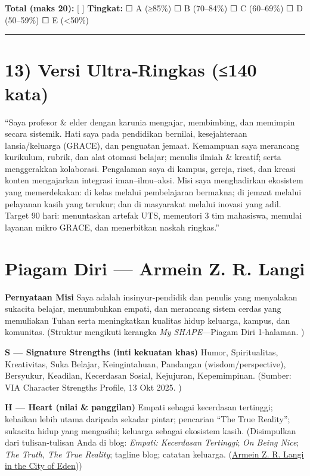 \documentclass[
  letterpaper,
  DIV=11,
  numbers=noendperiod]{scrreprt}
\begin{document}
\textbf{Total (maks 20):} {[} {]} \textbf{Tingkat:} ☐ A (≥85\%) ☐ B
(70--84\%) ☐ C (60--69\%) ☐ D (50--59\%) ☐ E (\textless50\%)

\begin{center}\rule{0.5\linewidth}{0.5pt}\end{center}

\section{13) Versi Ultra‑Ringkas (≤140
kata)}\label{versi-ultraringkas-140-kata}

``Saya profesor \& elder dengan karunia mengajar, membimbing, dan
memimpin secara sistemik. Hati saya pada pendidikan bernilai,
kesejahteraan lansia/keluarga (GRACE), dan penguatan jemaat. Kemampuan
saya merancang kurikulum, rubrik, dan alat otomasi belajar; menulis
ilmiah \& kreatif; serta menggerakkan kolaborasi. Pengalaman saya di
kampus, gereja, riset, dan kreasi konten mengajarkan integrasi
iman--ilmu--aksi. Misi saya menghadirkan ekosistem yang memerdekakan: di
kelas melalui pembelajaran bermakna; di jemaat melalui pelayanan kasih
yang terukur; dan di masyarakat melalui inovasi yang adil. Target 90
hari: menuntaskan artefak UTS, mementori 3 tim mahasiswa, memulai
layanan mikro GRACE, dan menerbitkan naskah ringkas.''

\section{Piagam Diri --- Armein Z. R.
Langi}\label{piagam-diri-armein-z.-r.-langi}

\textbf{Pernyataan Misi} Saya adalah insinyur-pendidik dan penulis yang
menyalakan sukacita belajar, menumbuhkan empati, dan merancang sistem
cerdas yang memuliakan Tuhan serta meningkatkan kualitas hidup keluarga,
kampus, dan komunitas. (Struktur mengikuti kerangka \emph{My
SHAPE}---Piagam Diri 1-halaman. )

\textbf{S --- Signature Strengths (inti kekuatan khas)} Humor,
Spiritualitas, Kreativitas, Suka Belajar, Keingintahuan, Pandangan
(wisdom/perspective), Bersyukur, Keadilan, Kecerdasan Sosial, Kejujuran,
Kepemimpinan. (Sumber: VIA Character Strengths Profile, 13 Okt 2025. )

\textbf{H --- Heart (nilai \& panggilan)} Empati sebagai kecerdasan
tertinggi; kebaikan lebih utama daripada sekadar pintar; pencarian ``The
True Reality''; sukacita hidup yang mengasihi; keluarga sebagai
ekosistem kasih. (Disimpulkan dari tulisan-tulisan Anda di blog:
\emph{Empati: Kecerdasan Tertinggi}; \emph{On Being Nice}; \emph{The
Truth, The True Reality}; tagline blog; catatan keluarga.
(\href{https://ii-2100.github.io/all-about-me/}{Armein Z. R. Langi in
the City of Eden}))
\end{document}
